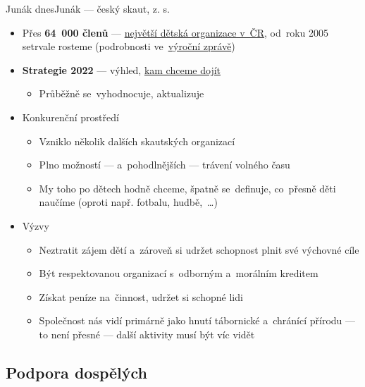 \documentclass[compress, ucs, xelatex, 11pt, xcolor=dvipsnames, print, aspectratio=169,
	hyperref={
		bookmarks=true,
		unicode=true,
		colorlinks=true,
		pdftitle={Skautska vychovna metoda},
		plainpages=false,
		pdfauthor={Vojtech Zeisek},
		pdfsubject={Skautska vychovna metoda a jeji vyvoj za posledni stoleti a desetileti},
		pdfcreator={XeLaTeX},
		pdfkeywords={Junak, Pedagogika, Skaut, Skauting, Vychovna metoda},
		linkcolor=Red, %
		anchorcolor=ForestGreen, %
		citecolor=ForestGreen, %
		filecolor=ForestGreen, %
		menucolor=ForestGreen, %
		urlcolor=Sepia, %
		pdftex},
	url={hyphens, lowtilde} %
	]{beamer}
\begin{document}
\begin{frame}{Junák dnes}{Junák --- český skaut, z. s.}
	\begin{itemize}
		\item Přes \textbf{64~000 členů} --- \href{https://www.skaut.cz/skauting/}{největší dětská organizace v~ČR}, od~roku 2005 setrvale rosteme (podrobnosti ve~\href{https://krizovatka.skaut.cz/stredisko/propagace/propagacni-materialy/vyrocni-zpravy/1002-vyrocni-zpravy}{výroční zprávě})
		\item \textbf{Strategie 2022} --- výhled, \href{https://krizovatka.skaut.cz/organizace/ustredi/strategie2022}{kam chceme dojít}
		\begin{itemize}
			\item Průběžně se~vyhodnocuje, aktualizuje
		\end{itemize}
		\item Konkurenční prostředí
		\begin{itemize}
			\item Vzniklo několik dalších skautských organizací
			\item Plno možností --- a~pohodlnějších --- trávení volného času
			\item My toho po dětech hodně chceme, špatně se~definuje, co~přesně děti naučíme (oproti např. fotbalu, hudbě,~\ldots)
		\end{itemize}
		\item Výzvy
		\begin{itemize}
			\item Neztratit zájem dětí a~zároveň si udržet schopnost plnit své výchovné cíle
			\item Být respektovanou organizací s~odborným a~morálním kreditem
			\item Získat peníze na~činnost, udržet si schopné lidi
			\item Společnost nás vidí primárně jako hnutí tábornické a~chránící přírodu --- to není přesné --- další aktivity musí být víc vidět
		\end{itemize}
	\end{itemize}
\end{frame}

\subsection{Podpora dospělých}
\end{document}
